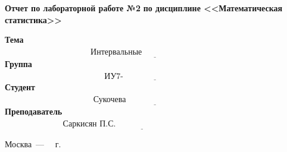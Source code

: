 \begin{titlepage}
	\begin{center}
		\noindent\begin{minipage}{1.1\textwidth}\centering
			\Large\textbf{  Отчет по лабораторной работе №2}\newline
			\textbf{по дисциплине <<Математическая статистика>>}\newline\newline
		\end{minipage}
	\end{center}
	
	\noindent\textbf{Тема} $\underline{\text{~~~~~~~~~~~~~~~~~~~~~~~~~~~~~~~Интервальные оценки~~~~~~~~~~~~~~~~~~~~~~~~~~~~~~~~~~~~~~~~~~~~~~~~~~~~~~~}}$\newline\newline
	\noindent\textbf{Группа} $\underline{\text{~~~~~~~~~~~~~~~~~~~~~~~~~~~~~~~~~~~~ИУ7-63Б~~~~~~~~~~~~~~~~~~~~~~~~~~~~~~~~~~~~~~~~~~~~~~~~~~~~~~~~~~~~~~~~~}}$\newline\newline
	\noindent\textbf{Студент} $\underline{\text{~~~~~~~~~~~~~~~~~~~~~~~~~~~~~~~~Сукочева А.~~~~~~~~~~~~~~~~~~~~~~~~~~~~~~~~~~~~~~~~~~~~~~~~~~~~~~~~~~~~~~}}$\newline\newline
	\noindent\textbf{Преподаватель} $\underline{\text{~~~~~~~~~~~~~~~~~~~~~Саркисян П.С.~~~~~~~~~~~~~~~~~~~~~~~~~~~~~~~~~~~~~~~~~~~~~~~~~~~~~~~~~~~}}$\newline\newline\newline
	
\begin{center}
	\vfill
	Москва~---~\the\year
	~г.
\end{center}

\end{titlepage}